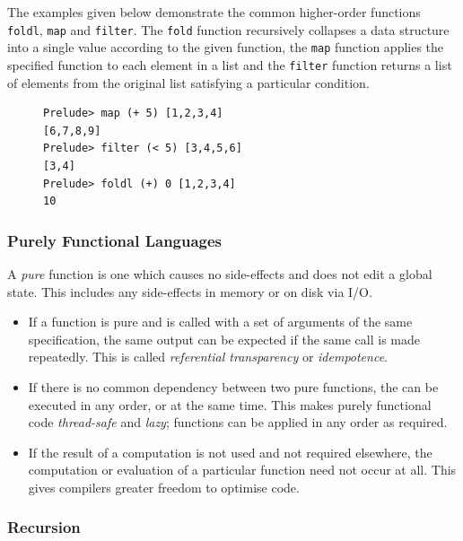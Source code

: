 \documentclass[10pt]{article}
\begin{document}
The examples given below demonstrate the common higher-order functions \texttt{foldl}, \texttt{map} and \texttt{filter}. The \texttt{fold} function recursively collapses a data structure into a single value according to the given function, the \texttt{map} function applies the specified function to each element in a list and the \texttt{filter} function returns a list of elements from the original list satisfying a particular condition.

\begin{figure}[H]
\begin{verbatim}
Prelude> map (+ 5) [1,2,3,4]
[6,7,8,9]
Prelude> filter (< 5) [3,4,5,6]
[3,4]
Prelude> foldl (+) 0 [1,2,3,4]
10
\end{verbatim}
\end{figure}

\subsubsection{Purely Functional Languages}
\label{sec:orge1f8118}

A \emph{pure} function is one which causes no side-effects and does not edit a global state. This includes any side-effects in memory or on disk via I/O.

\begin{itemize}
\item If a function is pure and is called with a set of arguments of the same specification, the same output can be expected if the same call is made repeatedly. This is called \emph{referential transparency} or \emph{idempotence}.

\item If there is no common dependency between two pure functions, the can be executed in any order, or at the same time. This makes purely functional code \emph{thread-safe} and \emph{lazy}; functions can be applied in any order as required.

\item If the result of a computation is not used and not required elsewhere, the computation or evaluation of a particular function need not occur at all. This gives compilers greater freedom to optimise code.
\end{itemize}

\subsubsection{Recursion}
\label{sec:org73b5084}
\end{document}
